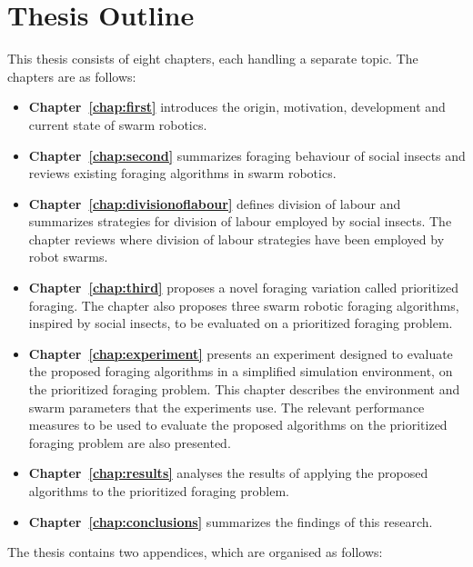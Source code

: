 \section{Thesis Outline}
\label{sec:introduction:outline}
This thesis consists of eight chapters, each handling a separate topic. The chapters are as follows:

\begin{itemize}
\item\textbf{Chapter~\ref{chap:first}} introduces the origin, motivation, development and current state of swarm robotics.

\item\textbf{Chapter~\ref{chap:second}} summarizes foraging behaviour of social insects and reviews existing foraging algorithms in swarm robotics.

\item\textbf{Chapter~\ref{chap:divisionoflabour}} defines division of labour and summarizes strategies for division of labour employed by social insects. The chapter reviews where division of labour strategies have been employed by robot swarms.

\item\textbf{Chapter~\ref{chap:third}} proposes a novel foraging variation called prioritized foraging. The chapter also proposes three swarm robotic foraging algorithms, inspired by social insects, to be evaluated on a prioritized foraging problem.

\item\textbf{Chapter~\ref{chap:experiment}} presents an experiment designed to evaluate the proposed foraging algorithms in a simplified simulation environment, on the prioritized foraging problem. This chapter describes the environment and swarm parameters that the experiments use. The relevant performance measures to be used to evaluate the proposed algorithms on the prioritized foraging problem are also presented.

\item\textbf{Chapter~\ref{chap:results}} analyses the results of applying the proposed algorithms to the prioritized foraging problem.

\item\textbf{Chapter~\ref{chap:conclusions}} summarizes the findings of this research.

\end{itemize}

The thesis contains two appendices, which are organised as follows:

